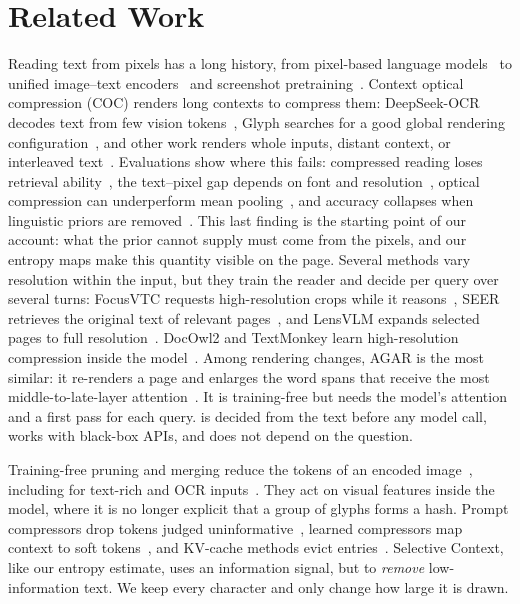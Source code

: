 \section{Related Work}
\label{sec:related}



Reading text from pixels has a long history, from pixel-based language models~\cite{rust2023pixel,gao2024screenshots} to unified image--text encoders~\cite{tschannen2023clippo} and screenshot pretraining~\cite{lee2023pix2struct}.
Context optical compression (COC) renders long contexts to compress them: DeepSeek-OCR decodes text from few vision tokens~\cite{wei2025deepseekocr,wei2026deepseekocr2}, Glyph searches for a good global rendering configuration~\cite{cheng2025glyph}, and other work renders whole inputs, distant context, or interleaved text~\cite{li2025textpixels,xing2025vist,wang2024visincontext}.
Evaluations show where this fails: compressed reading loses retrieval ability~\cite{zhao2025vtcbench}, the text--pixel gap depends on font and resolution~\cite{sun2026reading}, optical compression can underperform mean pooling~\cite{lee2026autoencoding}, and accuracy collapses when linguistic priors are removed~\cite{liang2026visualmerit,gao2026zerosense}.
This last finding is the starting point of our account: what the prior cannot supply must come from the pixels, and our entropy maps make this quantity visible on the page.
Several methods vary resolution within the input, but they train the reader and decide per query over several turns: FocusVTC requests high-resolution crops while it reasons~\cite{zhong2026focusvtc}, SEER retrieves the original text of relevant pages~\cite{xu2026seer}, and LensVLM expands selected pages to full resolution~\cite{xie2026lensvlm}.
DocOwl2 and TextMonkey learn high-resolution compression inside the model~\cite{hu2024docowl2,liu2024textmonkey}.
Among rendering changes, AGAR is the most similar: it re-renders a page and enlarges the word spans that receive the most middle-to-late-layer attention~\cite{zeng2026agar}. It is training-free but needs the model's attention and a first pass for each query.
\name is decided from the text before any model call, works with black-box APIs, and does not depend on the question.

Training-free pruning and merging reduce the tokens of an encoded image~\cite{chen2024fastv,zhang2025sparsevlm,yang2025visionzip,shang2025prumerge,bolya2023tome,fang2026prunesid,lv2026vprune,zhang2026trio}, including for text-rich and OCR inputs~\cite{wan2026rtprune,li2025fcotvl}.
They act on visual features inside the model, where it is no longer explicit that a group of glyphs forms a hash.
Prompt compressors drop tokens judged uninformative~\cite{jiang2023llmlingua,jiang2024longllmlingua,li2023selective,pan2024llmlingua2}, learned compressors map context to soft tokens~\cite{mu2023gist,ge2024icae,chevalier2023autocompressors}, and KV-cache methods evict entries~\cite{zhang2023h2o,li2024snapkv,xiao2024streamingllm,devoto2025expected}.
Selective Context, like our entropy estimate, uses an information signal, but to \emph{remove} low-information text. We keep every character and only change how large it is drawn.



